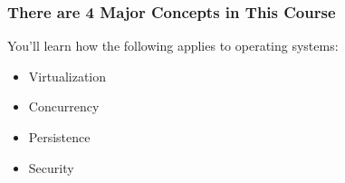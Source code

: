   \begin{frame}
    \frametitle{There are 4 Major Concepts in This Course}

    You'll learn how the following applies to operating systems:
    \begin{itemize}
      \item Virtualization
      \item Concurrency
      \item Persistence
      \item Security
    \end{itemize}
  \end{frame}

